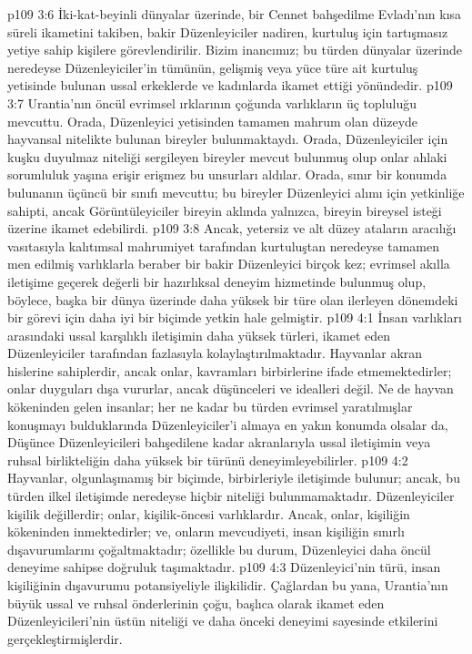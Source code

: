 \vs p109 3:6 İki\hyp{}kat\hyp{}beyinli dünyalar üzerinde, bir Cennet bahşedilme Evladı’nın kısa süreli ikametini takiben, bakir Düzenleyiciler nadiren, kurtuluş için tartışmasız yetiye sahip kişilere görevlendirilir. Bizim inancımız; bu türden dünyalar üzerinde neredeyse Düzenleyiciler’in tümünün, gelişmiş veya yüce türe ait kurtuluş yetisinde bulunan ussal erkeklerde ve kadınlarda ikamet ettiği yönündedir.
\vs p109 3:7 Urantia’nın öncül evrimsel ırklarının çoğunda varlıkların üç topluluğu mevcuttu. Orada, Düzenleyici yetisinden tamamen mahrum olan düzeyde hayvansal nitelikte bulunan bireyler bulunmaktaydı. Orada, Düzenleyiciler için kuşku duyulmaz niteliği sergileyen bireyler mevcut bulunmuş olup onlar ahlaki sorumluluk yaşına erişir erişmez bu unsurları aldılar. Orada, sınır bir konumda bulunanın üçüncü bir sınıfı mevcuttu; bu bireyler Düzenleyici alımı için yetkinliğe sahipti, ancak Görüntüleyiciler bireyin aklında yalnızca, bireyin bireysel isteği üzerine ikamet edebilirdi.
\vs p109 3:8 Ancak, yetersiz ve alt düzey ataların aracılığı vasıtasıyla kalıtımsal mahrumiyet tarafından kurtuluştan neredeyse tamamen men edilmiş varlıklarla beraber bir bakir Düzenleyici birçok kez; evrimsel akılla iletişime geçerek değerli bir hazırlıksal deneyim hizmetinde bulunmuş olup, böylece, başka bir dünya üzerinde daha yüksek bir türe olan ilerleyen dönemdeki bir görevi için daha iyi bir biçimde yetkin hale gelmiştir.
\vs p109 4:1 İnsan varlıkları arasındaki ussal karşılıklı iletişimin daha yüksek türleri, ikamet eden Düzenleyiciler tarafından fazlasıyla kolaylaştırılmaktadır. Hayvanlar akran hislerine sahiplerdir, ancak onlar, kavramları birbirlerine ifade etmemektedirler; onlar duyguları dışa vururlar, ancak düşünceleri ve idealleri değil. Ne de hayvan kökeninden gelen insanlar; her ne kadar bu türden evrimsel yaratılmışlar konuşmayı bulduklarında Düzenleyiciler’i almaya en yakın konumda olsalar da, Düşünce Düzenleyicileri bahşedilene kadar akranlarıyla ussal iletişimin veya ruhsal birlikteliğin daha yüksek bir türünü deneyimleyebilirler.
\vs p109 4:2 Hayvanlar, olgunlaşmamış bir biçimde, birbirleriyle iletişimde bulunur; ancak, bu türden ilkel iletişimde neredeyse hiçbir  niteliği bulunmamaktadır. Düzenleyiciler kişilik değillerdir; onlar, kişilik\hyp{}öncesi varlıklardır. Ancak, onlar, kişiliğin kökeninden inmektedirler; ve, onların mevcudiyeti, insan kişiliğin sınırlı dışavurumlarını çoğaltmaktadır; özellikle bu durum, Düzenleyici daha öncül deneyime sahipse doğruluk taşımaktadır.
\vs p109 4:3 Düzenleyici’nin türü, insan kişiliğinin dışavurumu potansiyeliyle ilişkilidir. Çağlardan bu yana, Urantia’nın büyük ussal ve ruhsal önderlerinin çoğu, başlıca olarak ikamet eden Düzenleyicileri’nin üstün niteliği ve daha önceki deneyimi sayesinde etkilerini gerçekleştirmişlerdir.
